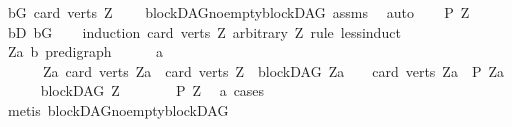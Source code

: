 \begin{isabellebody}
\ bG{\isacharcolon}{\kern0pt}\ {\isachardoublequoteopen}card\ {\isacharparenleft}{\kern0pt}verts\ Z{\isacharparenright}{\kern0pt}\ {\isachargreater}{\kern0pt}\ {}{\isachardoublequoteclose}\ \isamarkupfalse%
\ blockDAG{\isachardot}{\kern0pt}no{\isacharunderscore}{\kern0pt}empty{\isacharunderscore}{\kern0pt}blockDAG\ assms{\isacharparenleft}{\kern0pt}{}{\isacharparenright}{\kern0pt}\ \isamarkupfalse%
\ auto\isanewline
\ \ \isamarkupfalse%
\ {\isachardoublequoteopen}P\ Z{\isachardoublequoteclose}\isanewline
\ \ \ \ \isamarkupfalse%
\ bD\ bG\isanewline
\ \ \isamarkupfalse%
\ {\isacharparenleft}{\kern0pt}induction\ {\isachardoublequoteopen}card\ {\isacharparenleft}{\kern0pt}verts\ Z{\isacharparenright}{\kern0pt}{\isachardoublequoteclose}\ arbitrary{\isacharcolon}{\kern0pt}\ Z\ rule{\isacharcolon}{\kern0pt}\ less{\isacharunderscore}{\kern0pt}induct{\isacharparenright}{\kern0pt}\isanewline
\ \ \ \ \isamarkupfalse%
\ Z{\isacharcolon}{\kern0pt}{\isacharcolon}{\kern0pt}{\isachardoublequoteopen}{\isacharparenleft}{\kern0pt}{\isacharprime}{\kern0pt}a{\isacharcomma}{\kern0pt}\ {\isacharprime}{\kern0pt}b{\isacharparenright}{\kern0pt}\ pre{\isacharunderscore}{\kern0pt}digraph{\isachardoublequoteclose}\isanewline
\ \ \ \ \isamarkupfalse%
\ a{\isacharcolon}{\kern0pt}\isanewline
\ \ \ \ \ \ {\isachardoublequoteopen}{\isacharparenleft}{\kern0pt}{\isasymAnd}Za{\isachardot}{\kern0pt}\ card\ {\isacharparenleft}{\kern0pt}verts\ Za{\isacharparenright}{\kern0pt}\ {\isacharless}{\kern0pt}\ card\ {\isacharparenleft}{\kern0pt}verts\ Z{\isacharparenright}{\kern0pt}\ {\isasymLongrightarrow}\ blockDAG\ Za\ {\isasymLongrightarrow}\ {}\ {\isacharless}{\kern0pt}\ card\ {\isacharparenleft}{\kern0pt}verts\ Za{\isacharparenright}{\kern0pt}\ {\isasymLongrightarrow}\ P\ Za{\isacharparenright}{\kern0pt}{\isachardoublequoteclose}\isanewline
\ \ \ \ \isamarkupfalse%
\ {\isachardoublequoteopen}blockDAG\ Z{\isachardoublequoteclose}\isanewline
\ \ \ \ \isamarkupfalse%
\ \isamarkupfalse%
\ {\isachardoublequoteopen}P\ Z{\isachardoublequoteclose}\ \isamarkupfalse%
\ a\ cases\isanewline
\ \ \ \ \ \ \isamarkupfalse%
\ {\isacharparenleft}{\kern0pt}metis\ blockDAG{\isachardot}{\kern0pt}no{\isacharunderscore}{\kern0pt}empty{\isacharunderscore}{\kern0pt}blockDAG{\isacharparenright}{\kern0pt}\isanewline
\ \ \isamarkupfalse%
\isanewline
{}\isamarkupfalse%

\end{isabellebody}
